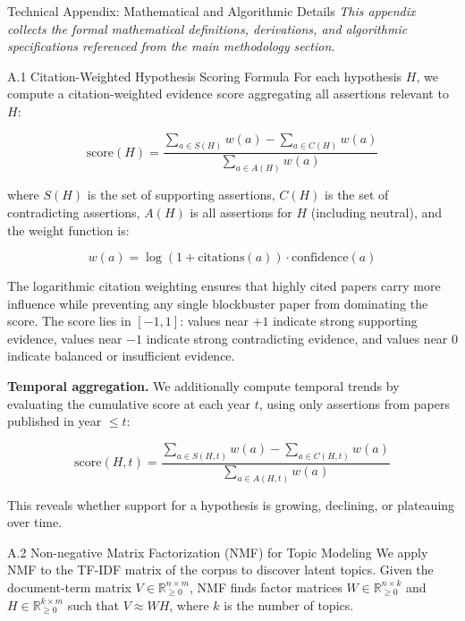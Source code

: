 \documentclass[
  ignorenonframetext,
]{beamer}
\author{\texorpdfstring{}{}}
\date{}
\begin{document}
\begin{frame}[fragile]{Technical Appendix: Mathematical and Algorithmic
Details \label{sec:technical_appendix}}
\protect{}\label{technical-appendix-mathematical-and-algorithmic-details}
\emph{This appendix collects the formal mathematical definitions,
derivations, and algorithmic specifications referenced from the main
methodology section.}

\begin{block}{A.1 Citation-Weighted Hypothesis Scoring Formula}
\protect{}\label{a.1-citation-weighted-hypothesis-scoring-formula}
For each hypothesis \(H\), we compute a citation-weighted evidence score
aggregating all assertions relevant to \(H\):

\[
\text{score}(H) = \frac{\sum_{a \in S(H)} w(a) - \sum_{a \in C(H)} w(a)}{\sum_{a \in A(H)} w(a)}
\]

where \(S(H)\) is the set of supporting assertions, \(C(H)\) is the set
of contradicting assertions, \(A(H)\) is all assertions for \(H\)
(including neutral), and the weight function is:

\[
w(a) = \log(1 + \text{citations}(a)) \cdot \text{confidence}(a)
\]

The logarithmic citation weighting ensures that highly cited papers
carry more influence while preventing any single blockbuster paper from
dominating the score. The score lies in \([-1, 1]\): values near \(+1\)
indicate strong supporting evidence, values near \(-1\) indicate strong
contradicting evidence, and values near \(0\) indicate balanced or
insufficient evidence.

\textbf{Temporal aggregation.} We additionally compute temporal trends
by evaluating the cumulative score at each year \(t\), using only
assertions from papers published in year \(\leq t\):

\[
\text{score}(H, t) = \frac{\sum_{a \in S(H,t)} w(a) - \sum_{a \in C(H,t)} w(a)}{\sum_{a \in A(H,t)} w(a)}
\]

This reveals whether support for a hypothesis is growing, declining, or
plateauing over time.
\end{block}

\begin{block}{A.2 Non-negative Matrix Factorization (NMF) for Topic
Modeling}
\protect{}\label{a.2-non-negative-matrix-factorization-nmf-for-topic-modeling}
We apply NMF to the TF-IDF matrix of the corpus to discover latent
topics. Given the document-term matrix
\(V \in \mathbb{R}^{n \times m}_{\geq 0}\), NMF finds factor matrices
\(W \in \mathbb{R}^{n \times k}_{\geq 0}\) and
\(H \in \mathbb{R}^{k \times m}_{\geq 0}\) such that \(V \approx WH\),
where \(k\) is the number of topics.


\end{block}
\end{frame}
\end{document}
